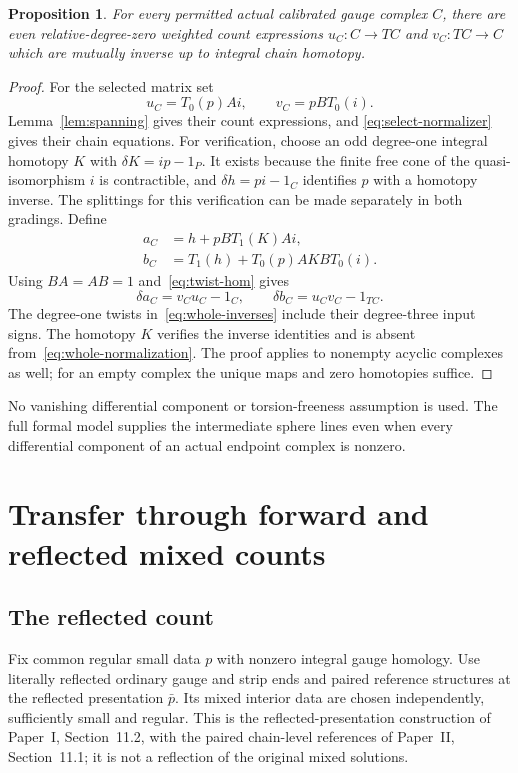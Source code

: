 \documentclass[11pt]{amsart}
\newtheorem{proposition}[theorem]{Proposition}
\theoremstyle{definition}
\theoremstyle{remark}
\theoremstyle{plain}
\begin{document}
\begin{proposition}\label{prop:gauge-normalization}
For every permitted actual calibrated gauge complex $C$, there
are even relative-degree-zero weighted count expressions
$u_C:C\to TC$ and $v_C:TC\to C$ which are mutually inverse
up to integral chain homotopy.
\end{proposition}
\begin{proof}
For the selected matrix set
\begin{equation}\label{eq:whole-normalization}
 u_C=T_0(p)Ai,\qquad v_C=pB T_0(i).
\end{equation}
Lemma~\ref{lem:spanning} gives their count expressions, and
\eqref{eq:select-normalizer} gives their chain equations.
For verification, choose an odd degree-one integral homotopy
$K$ with $\delta K=ip-1_P$. It exists because the finite free
cone of the quasi-isomorphism $i$ is contractible, and
$\delta h=pi-1_C$ identifies $p$ with a homotopy inverse.
The splittings for this verification can be made separately
in both gradings. Define
\begin{align}\label{eq:whole-inverses}
 a_C&=h+pB T_1(K)Ai,\nonumber\\
 b_C&=T_1(h)+T_0(p)A K B T_0(i).
\end{align}
Using $BA=AB=1$ and~\eqref{eq:twist-hom} gives
\[
 \delta a_C=v_Cu_C-1_C,\qquad
 \delta b_C=u_Cv_C-1_{TC}.
\]
The degree-one twists in~\eqref{eq:whole-inverses} include
their degree-three input signs. The homotopy $K$ verifies the
inverse identities and is absent from~\eqref{eq:whole-normalization}.
The proof applies to nonempty acyclic complexes as well; for
an empty complex the unique maps and zero homotopies suffice.
\end{proof}

No vanishing differential component or torsion-freeness assumption
is used. The full formal model supplies the intermediate sphere
lines even when every differential component of an actual
endpoint complex is nonzero.

\section{Transfer through forward and reflected mixed counts}
\label{sec:reverse}

\subsection{The reflected count}
Fix common regular small data $p$ with nonzero integral gauge
homology. Use literally reflected ordinary gauge and strip ends
and paired reference structures at the reflected presentation
$\bar p$. Its mixed interior data are chosen independently,
sufficiently small and regular. This is the reflected-presentation
construction of Paper~I, Section~11.2, with the paired chain-level
references of Paper~II, Section~11.1; it is not a reflection
of the original mixed solutions.
\end{document}
